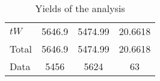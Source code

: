 \documentclass[10pt]{article}
\begin{document}
\begin{table}[htbp]
\begin{center}
\begin{tabular}{|l|S|S|S|}
\hline 
 & {} & {} & {}\\
\hline 
  $tW$   & 5646.9  & 5474.99  & 20.6618  \\ 
\hline 
  Total  & 5646.9  & 5474.99  & 20.6618  \\ 
\hline 
  Data   & 5456 & 5624 & 63 \\ 
\hline 
\end{tabular} 
\caption{Yields of the analysis} 
\end{center} 
\end{table} 
\end{document}
